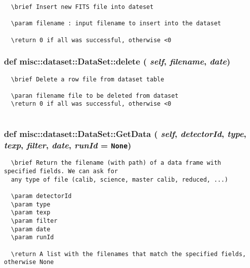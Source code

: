 \footnotesize\begin{verbatim}
  \brief Insert new FITS file into dateset

  \param filename : input filename to insert into the dataset

  \return 0 if all was successful, otherwise <0
\end{verbatim}
\normalsize
\subsubsection{\setlength{\rightskip}{0pt plus 5cm}def misc::dataset::Data\-Set::delete ( {\em self},  {\em filename},  {\em date})}\label{classmisc_1_1dataset_1_1DataSet_41d8df35f235d2302eb8d0fa63f9c8b6}




\footnotesize\begin{verbatim}
  \brief Delete a row file from dataset table

  \paran filename file to be deleted from dataset
  \return 0 if all was successful, otherwise <0
  
\end{verbatim}
\normalsize
\subsubsection{\setlength{\rightskip}{0pt plus 5cm}def misc::dataset::Data\-Set::Get\-Data ( {\em self},  {\em detector\-Id},  {\em type},  {\em texp},  {\em filter},  {\em date},  {\em run\-Id} = {\tt None})}\label{classmisc_1_1dataset_1_1DataSet_47354aea694999e6c92c9fda6512375a}




\footnotesize\begin{verbatim}
  \brief Return the filename (with path) of a data frame with specified fields. We can ask for
  any type of file (calib, science, master calib, reduced, ...)

  \param detectorId
  \param type
  \param texp
  \param filter
  \param date
  \param runId

  \return A list with the filenames that match the specified fields, otherwise None
\end{verbatim}
\normalsize
